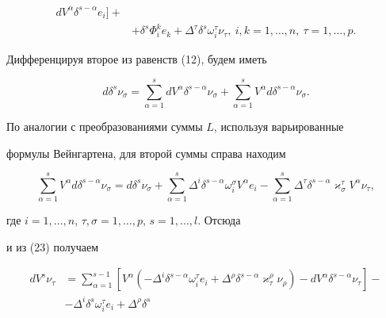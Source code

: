 \begin{pf}
\begin{equation}
\begin{split}
dV^{\alpha}\delta^{s-\alpha}e_i]+\\


&+\delta^s\Phi^k_ie_k+\Delta^{\tau}\delta^s\omega^{\tau}_i\nu_{\tau}, 


\ i,k=1,\dotsc,n, \ \tau=1,\dotsc,p.


\end{split}


\end{equation}





Дифференцируя второе из равенств (12), будем иметь


$$


d\delta^s\nu_{\sigma}=\sum_{\alpha=1}^{s}dV^{\alpha}\delta^{s-\alpha}


\nu_{\sigma}+\sum_{\alpha=1}^{s}V^{\alpha}d\delta^{s-\alpha}\nu_{\sigma}.


$$


По аналогии с преобразованиями суммы $L$, используя варьированные


формулы Вейнгартена, для второй суммы справа находим


$$


\sum_{\alpha=1}^{s}V^{\alpha}d\delta^{s-\alpha}\nu_{\sigma}=


d\delta^s\nu_{\sigma}+\sum_{\alpha=1}^{s}\Delta^i\delta^{s-\alpha}


\omega^{\sigma}_iV^{\alpha}e_i-


\sum_{\alpha=1}^{s}\Delta^{\tau}\delta^{s-\alpha}\varkappa^{\tau}_{\sigma}


V^{\alpha}\nu_{\tau},


$$


где $i= 1,\dotsc,n$, $\tau,\sigma= 1,\dotsc,p$, $s= 1,\dotsc,l$. Отсюда


и из (23) получаем


\begin{equation}


\begin{split}


dV^s\nu_{\tau}&=


\sum_{\alpha=1}^{s-1}[V^{\alpha}(-\Delta^i\delta^{s-\alpha}


\omega^{\tau}_ie_i+


\Delta^{\rho}\delta^{s-\alpha}\varkappa^{\rho}_{\tau}\nu_{\rho})-


dV^{\alpha}\delta^{s-\alpha}\nu_{\tau}]-\\


&-\Delta^i\delta^s\omega^{\tau}_ie_i+\Delta^{\rho}\delta^s



\end{split}
\end{equation}
\end{pf}
